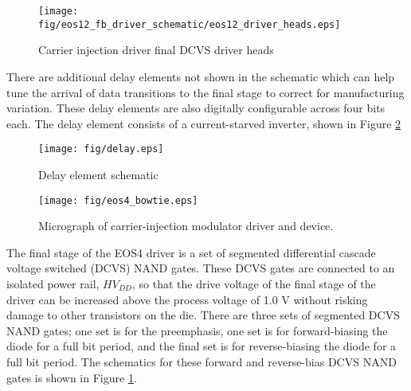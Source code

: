 	\begin{figure}[H]
		\begin{center}
			\texttt{[image: fig/eos12\_fb\_driver\_schematic/eos12\_driver\_heads.eps]}
			\caption{\label{fig:eos12_driver_heads}Carrier injection driver final DCVS driver heads}
		\end{center}
	\end{figure}


 There are additional delay elements not shown in the schematic which can help tune the arrival of data transitions to the final stage to correct for manufacturing variation.  These delay elements are also digitally configurable across four bits each.  The delay element consists of a current-starved inverter, shown in Figure \ref{fig:delay}
	\begin{figure}[H]
		\begin{center}
			\texttt{[image: fig/delay.eps]}
			\caption{\label{fig:delay}Delay element schematic}
		\end{center}
	\end{figure}


	\begin{figure}[H]
		\begin{center}
			\texttt{[image: fig/eos4\_bowtie.eps]}
			\caption{\label{fig:eos4_bowtie}Micrograph of carrier-injection modulator driver and device.}
		\end{center}
	\end{figure}





The final stage of the EOS4 driver is a set of segmented differential cascade voltage switched (DCVS) NAND gates.  These DCVS gates are connected to an isolated power rail, $HV_{DD}$, so that the drive voltage of the final stage of the driver can be increased above the process voltage of 1.0 V without risking damage to other transistors on the die.  There are three sets of segmented DCVS NAND gates; one set is for the preemphasis, one set is for forward-biasing the diode for a full bit period, and the final set is for reverse-biasing the diode for a full bit period.  The schematics for these forward and reverse-bias DCVS NAND gates is shown in Figure \ref{fig:eos12_driver_heads}.


